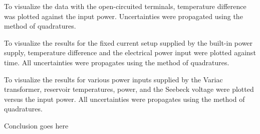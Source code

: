 \begin{paper}
	
	To visualize the data with the open-circuited terminals, temperature difference was plotted against the input power. Uncertainties were propagated using the method of quadratures.
	
	
	To visualize the results for the fixed current setup supplied by the built-in power supply, temperature difference and the electrical power input were plotted against time. All uncertainties were propagates using the method of quadratures.
	
	
	To visualize the results for various power inputs supplied by the Variac transformer, reservoir temperatures, power, and the Seebeck voltage were plotted versus the input power. All uncertainties were propagates using the method of quadratures.
	
	
	
	

	Conclusion goes here
	


\end{paper}
